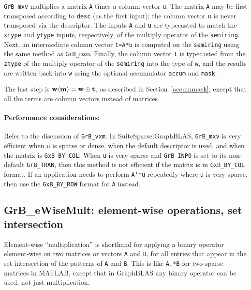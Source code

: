 \documentclass[12pt]{article}
\begin{document}
\verb'GrB_mxv' multiplies a matrix \verb'A' times a column vector \verb'u'.
The matrix \verb'A' may be first transposed according to \verb'desc' (as the
first input); the column vector \verb'u' is never transposed via the
descriptor.  The inputs \verb'A' and \verb'u' are typecasted to match the
\verb'xtype' and \verb'ytype' inputs, respectively, of the multiply operator of
the \verb'semiring'. Next, an intermediate column vector \verb't=A*u' is
computed on the \verb'semiring' using the same method as \verb'GrB_mxm'.
Finally, the column vector \verb't' is typecasted from the \verb'ztype' of the
multiply operator of the \verb'semiring' into the type of \verb'w', and the
results are written back into \verb'w' using the optional accumulator
\verb'accum' and \verb'mask'.

The last step is ${\bf w \langle m \rangle  = w \odot t}$, as described
in Section~\ref{accummask}, except that all the terms are column vectors instead
of matrices.

\paragraph{\bf Performance considerations:} %
Refer to the discussion of \verb'GrB_vxm'.  In SuiteSparse:GraphBLAS,
\verb'GrB_mxv' is very efficient when \verb'u' is sparse or dense, when the
default descriptor is used, and when the matrix is \verb'GxB_BY_COL'.  When
\verb'u' is very sparse and \verb'GrB_INP0' is set to its non-default
\verb'GrB_TRAN', then this method is not efficient if the matrix is in
\verb'GxB_BY_COL' format.  If an application needs to perform \verb"A'*u"
repeatedly where \verb'u' is very sparse, then use the \verb'GxB_BY_ROW' format
for \verb'A' instead.

\newpage
\subsection{{\sf GrB\_eWiseMult:} element-wise operations, set intersection} %
\label{eWiseMult}

Element-wise ``multiplication'' is shorthand for applying a binary operator
element-wise on two matrices or vectors \verb'A' and \verb'B', for all entries
that appear in the set intersection of the patterns of \verb'A' and \verb'B'.
This is like \verb'A.*B' for two sparse matrices in MATLAB, except that in
GraphBLAS any binary operator can be used, not just multiplication.
\end{document}
